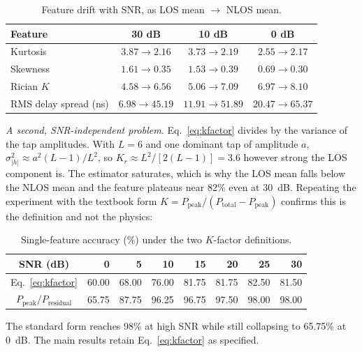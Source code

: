 \documentclass[11pt,a4paper]{article}
\begin{document}
\begin{table}[H]
\centering
\caption{Feature drift with SNR, as LOS mean $\rightarrow$ NLOS mean.}
\label{tab:drift}
\begin{tabular}{lccc}
\toprule
Feature & 30 dB & 10 dB & 0 dB \\
\midrule
Kurtosis              & $3.87 \rightarrow 2.16$ & $3.73 \rightarrow 2.19$ & $\mathbf{2.55 \rightarrow 2.17}$ \\
Skewness              & $1.61 \rightarrow 0.35$ & $1.53 \rightarrow 0.39$ & $\mathbf{0.69 \rightarrow 0.30}$ \\
Rician $K$            & $4.58 \rightarrow 6.56$ & $5.06 \rightarrow 7.09$ & $\mathbf{6.97 \rightarrow 8.10}$ \\
RMS delay spread (ns) & $6.98 \rightarrow 45.19$ & $11.91 \rightarrow 51.89$ & $20.47 \rightarrow 65.37$ \\
\bottomrule
\end{tabular}
\end{table}

\emph{A second, SNR-independent problem.} Eq.~\eqref{eq:kfactor} divides by the variance of the
tap amplitudes. With $L=6$ and one dominant tap of amplitude $a$,
$\sigma^2_{|h|} \approx a^2(L-1)/L^2$, so $K_r \approx L^2/[2(L-1)] = 3.6$ however strong the
LOS component is. The estimator saturates, which is why the LOS mean falls below the NLOS mean
and the feature plateaus near 82\% even at 30~dB. Repeating the experiment with the textbook
form $K = P_{\mathrm{peak}}/(P_{\mathrm{total}} - P_{\mathrm{peak}})$ confirms this is the
definition and not the physics:

\begin{table}[H]
\centering
\caption{Single-feature accuracy (\%) under the two $K$-factor definitions.}
\label{tab:kdefs}
\begin{tabular}{crrrrrrr}
\toprule
SNR (dB) & 0 & 5 & 10 & 15 & 20 & 25 & 30 \\
\midrule
Eq.~\eqref{eq:kfactor}                    & 60.00 & 68.00 & 76.00 & 81.75 & 81.75 & 82.50 & 81.50 \\
$P_{\mathrm{peak}}/P_{\mathrm{residual}}$ & 65.75 & 87.75 & 96.25 & 96.75 & 97.50 & 98.00 & 98.00 \\
\bottomrule
\end{tabular}
\end{table}

The standard form reaches 98\% at high SNR while still collapsing to 65.75\% at 0~dB. The main
results retain Eq.~\eqref{eq:kfactor} as specified.
\end{document}
